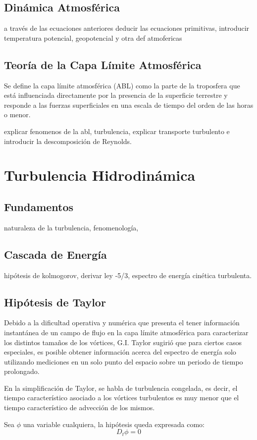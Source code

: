 \subsection{Dinámica Atmosférica}
a través de las ecuaciones anteriores deducir las ecuaciones primitivas, introducir temperatura potencial, geopotencial y otra def atmofericas
\subsection{Teoría de la Capa Límite Atmosférica}
Se define la capa límite atmosférica (ABL) como la parte de la troposfera que está influenciada directamente por la presencia de la superficie terrestre y responde a las fuerzas superficiales en una escala de tiempo del orden de las horas o menor.

explicar fenomenos de la abl, turbulencia, explicar transporte turbulento e introducir la descomposición de Reynolds.
\section{Turbulencia Hidrodinámica}
\subsection{Fundamentos}
naturaleza de la turbulencia, fenomenología, 
\subsection{Cascada de Energía}
hipótesis de kolmogorov, derivar ley -5/3, espectro de energía cinética turbulenta.
\subsection{Hipótesis de Taylor}
Debido a la dificultad operativa y numérica que presenta el tener información instantánea de un campo de flujo en la capa límite atmosférica para caracterizar los distintos tamaños de los vórtices, G.I. Taylor sugirió que para ciertos casos especiales, es posible obtener información acerca del espectro de energía solo utilizando mediciones en un solo punto del espacio sobre un periodo de tiempo prolongado.

En la simplificación de Taylor, se habla de turbulencia congelada, es decir, el tiempo característico asociado a los vórtices turbulentos es muy menor que el tiempo característico de advección de los mismos.

Sea $\phi$ una variable cualquiera, la hipótesis queda expresada como:
\begin{equation}
D_t\phi = 0
\end{equation}

